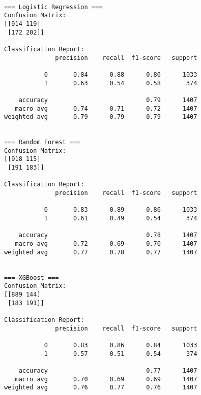 \documentclass[11pt]{article}
\begin{document}
    \begin{Verbatim}[commandchars=\\\{\}]

=== Logistic Regression ===
Confusion Matrix:
[[914 119]
 [172 202]]

Classification Report:
              precision    recall  f1-score   support

           0       0.84      0.88      0.86      1033
           1       0.63      0.54      0.58       374

    accuracy                           0.79      1407
   macro avg       0.74      0.71      0.72      1407
weighted avg       0.79      0.79      0.79      1407


=== Random Forest ===
Confusion Matrix:
[[918 115]
 [191 183]]

Classification Report:
              precision    recall  f1-score   support

           0       0.83      0.89      0.86      1033
           1       0.61      0.49      0.54       374

    accuracy                           0.78      1407
   macro avg       0.72      0.69      0.70      1407
weighted avg       0.77      0.78      0.77      1407


=== XGBoost ===
Confusion Matrix:
[[889 144]
 [183 191]]

Classification Report:
              precision    recall  f1-score   support

           0       0.83      0.86      0.84      1033
           1       0.57      0.51      0.54       374

    accuracy                           0.77      1407
   macro avg       0.70      0.69      0.69      1407
weighted avg       0.76      0.77      0.76      1407

    \end{Verbatim}
\end{document}

